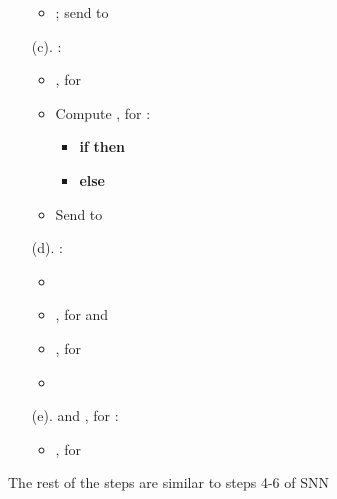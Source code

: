 \documentclass{article}
\newcommand{\sknnb}{SNN}
\begin{document}
\begin{algorithm}[!htbp]
\begin{algorithmic}[1]
\begin{enumerate}
\begin{itemize}
                \item ; send  to  
              \end{itemize}  
    \item[(c).] :
              \begin{itemize}\itemsep=-1pt
\item , for 
                \item Compute , for :
                     \begin{itemize}\itemsep=-1pt   
                             \item \textbf{if}  \textbf{then}  
                             \item \textbf{else} 
                     \end{itemize}
                \item Send  to      
               \end{itemize}
    \item[(d).] :
              \begin{itemize}\itemsep=-1pt
\item 
                 \item , for  and   
                 \item , for 
                 \item   
              \end{itemize} 
    \item[(e).]  and , for :
              \begin{itemize}
                \item , for 
              \end{itemize}    
\end{enumerate}
\hspace{-0.45cm} The rest of the steps are similar to steps 4-6 of \sknnb
\begin{comment}
\STATE :
\begin{enumerate}\itemsep=-1pt
     \item[(b).] Compute  where 
     \item[(c).] Send   to  and  to Bob
 \end{enumerate}

\STATE :
\begin{enumerate}\itemsep=-1pt
     \item[(a).] Receive  from 
     \item[(b).] Compute  
     \item[(c).] Send  to Bob 
 \end{enumerate}

\STATE  Bob:
\begin{enumerate}\itemsep=-1pt
     \item[(a).] Receive  from  and  from      
     \item[(b).] 
\end{enumerate}
\end{comment}
\end{algorithmic}
\caption{SNN}
\label{alg:main}
\end{algorithm} 
\end{document}
